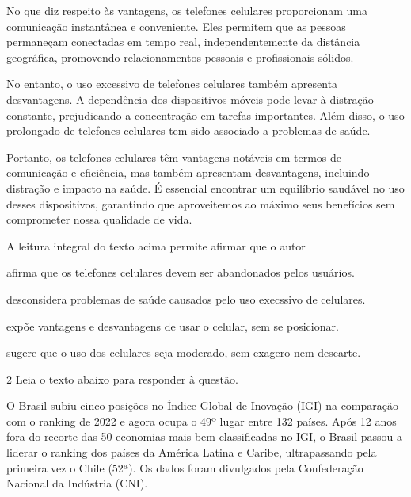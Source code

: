 {\begin{myquote}
No que diz respeito às vantagens, os telefones celulares proporcionam uma
comunicação instantânea e conveniente. Eles permitem que as pessoas permaneçam
conectadas em tempo real, independentemente da distância geográfica,
promovendo relacionamentos pessoais e profissionais sólidos. 

No entanto, o uso excessivo de telefones celulares também apresenta
desvantagens. A dependência dos dispositivos móveis pode levar à distração
constante, prejudicando a concentração em tarefas importantes. Além disso, o
uso prolongado de telefones celulares tem sido associado a problemas de saúde.

Portanto, os telefones celulares têm vantagens notáveis em termos de
comunicação e eficiência, mas também apresentam desvantagens, incluindo
distração e impacto na saúde. É essencial encontrar um equilíbrio saudável 
no uso desses dispositivos, garantindo que aproveitemos ao máximo seus 
benefícios sem comprometer nossa qualidade de vida.

\end{myquote}


A leitura integral do texto acima permite afirmar que o autor

\begin{escolha}
  
  \item afirma que os telefones celulares devem ser abandonados pelos usuários.
  
  \item desconsidera problemas de saúde causados pelo uso execssivo de celulares.
  
  \item expõe vantagens e desvantagens de usar o celular, sem se posicionar.
  
  \item sugere que o uso dos celulares seja moderado, sem exagero nem descarte.

\end{escolha}

\num{2} Leia o texto abaixo para responder à questão.

\begin{myquote}

O Brasil subiu cinco posições no Índice Global de Inovação (IGI) na comparação
com o ranking de 2022 e agora ocupa o 49º lugar entre 132 países. Após 12 anos
fora do recorte das 50 economias mais bem classificadas no IGI, o Brasil
passou a liderar o ranking dos países da América Latina e Caribe,
ultrapassando pela primeira vez o Chile (52ª). Os dados foram divulgados pela 
Confederação Nacional da Indústria (CNI).


\end{myquote}}
